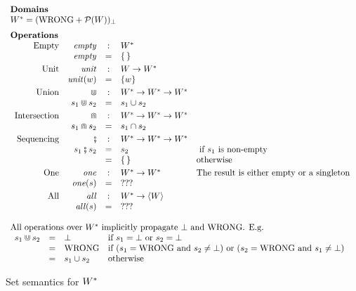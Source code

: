 \begin{figure}
$$
\begin{array}{l}
\text{\bf Domains} \\
W^{*}  =  (\mathrm{WRONG} + {\mathcal P}(W))_{\bot} \\[2mm]
\text{\bf Operations} \\
\begin{array}{rrcll}
\text{Empty}        & \mathit{empty} & : &  W^{*} \\
                    & \mathit{empty} & = & \{ \, \} \\[1mm]
\text{Unit}    & \mathit{unit} & : & W \rightarrow W^{*} \\
               & \mathit{unit}(w) & = & \{ w  \} \\[1mm]
\text{Union}   & \Cup & : & W^{*} \rightarrow W^{*} \rightarrow W^{*} \\
               &  s_1 \Cup s_2 & = & s_1 \cup s_2 \\[1mm]
\text{Intersection} & \Cap & : & W^{*} \rightarrow W^{*} \rightarrow W^{*} \\
                    &  s_1 \Cap s_2 & = & s_1 \cap s_2 \\[1mm]
\text{Sequencing}   & \fatsemi & : & W^{*} \rightarrow W^{*} \rightarrow W^{*} \\
                    &  s_1 \fatsemi s_2 & = & s_2 & \text{ if $s_1$ is non-empty} \\
            &          & = & \{\,\} & \text{otherwise} \\[1mm]
\text{One}          &   \mathit{one}  & : & W^{*} \rightarrow W^{*} & \text{The result is either empty or a singleton}\\
  & \mathit{one}(s) & = & ??? \\[1mm]
\text{All}          &   \mathit{all}  & : & W^{*} \rightarrow \langle W \rangle \\
  & \mathit{all}(s) & = & ??? \\
\end{array} \\ \\
\text{All operations over $W^{*}$ implicitly propagate $\bot$ and $\mathrm{WRONG}$.  E.g.}\\
  \begin{array}{rcll}
    s_1 \Cup s_2 & = & \bot & \text{if $s_1=\bot$ or $s_2=\bot$} \\
                    & = & \mathrm{WRONG} & \text{if $(s_1=\mathrm{WRONG}$ and $s_2 \neq \bot)$ or
                    $(s_2=\mathrm{WRONG}$ and $s_1 \neq \bot)$} \\
                    & = & s_1 \cup s_2 & \text{otherwise}
  \end{array}
\end{array}
$$
\caption{Set semantics for $W^{*}$}
\label{fig:set-sem}
\end{figure}

